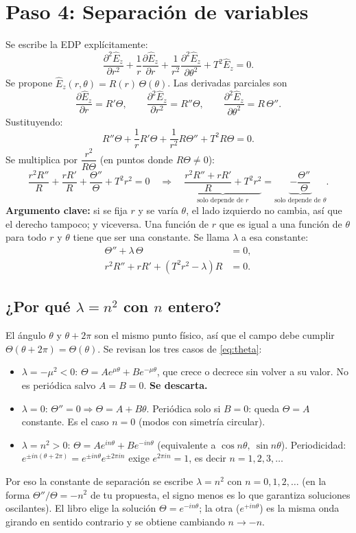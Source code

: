 \documentclass[11pt,a4paper]{article}
\begin{document}
\section{Paso 4: Separación de variables}

Se escribe la EDP explícitamente:
\[
\frac{\partial^2\hat E_z}{\partial r^2}+\frac1r\frac{\partial\hat E_z}{\partial r}+\frac1{r^2}\frac{\partial^2\hat E_z}{\partial\theta^2}+T^2\hat E_z=0 .
\]
Se propone $\hat E_z(r,\theta)=R(r)\,\Theta(\theta)$. Las derivadas parciales son
\[
\frac{\partial\hat E_z}{\partial r}=R'\Theta,\qquad
\frac{\partial^2\hat E_z}{\partial r^2}=R''\Theta,\qquad
\frac{\partial^2\hat E_z}{\partial\theta^2}=R\,\Theta'' .
\]
Sustituyendo:
\[
R''\Theta+\frac1rR'\Theta+\frac1{r^2}R\Theta''+T^2R\Theta=0 .
\]
Se multiplica por $\dfrac{r^2}{R\Theta}$ (en puntos donde $R\Theta\neq0$):
\[
\frac{r^2R''}{R}+\frac{rR'}{R}+\frac{\Theta''}{\Theta}+T^2r^2=0
\quad\Longrightarrow\quad
\underbrace{\frac{r^2R''+rR'}{R}+T^2r^2}_{\text{solo depende de }r}=\underbrace{-\frac{\Theta''}{\Theta}}_{\text{solo depende de }\theta}.
\]
\textbf{Argumento clave:} si se fija $r$ y se varía $\theta$, el lado izquierdo no cambia, así que el derecho tampoco; y viceversa. Una función de $r$ que es igual a una función de $\theta$ para todo $r$ y $\theta$ tiene que ser una constante. Se llama $\lambda$ a esa constante:
\begin{align}
\Theta''+\lambda\,\Theta&=0, \label{eq:theta}\\
r^2R''+rR'+(T^2r^2-\lambda)R&=0. \label{eq:radial}
\end{align}

\subsection{¿Por qué $\lambda=n^2$ con $n$ entero?}
El ángulo $\theta$ y $\theta+2\pi$ son el mismo punto físico, así que el campo debe cumplir $\Theta(\theta+2\pi)=\Theta(\theta)$. Se revisan los tres casos de \eqref{eq:theta}:
\begin{itemize}
\item $\lambda=-\mu^2<0$: $\Theta=Ae^{\mu\theta}+Be^{-\mu\theta}$, que crece o decrece sin volver a su valor. No es periódica salvo $A=B=0$. \textbf{Se descarta.}
\item $\lambda=0$: $\Theta''=0\Rightarrow\Theta=A+B\theta$. Periódica solo si $B=0$: queda $\Theta=A$ constante. Es el caso $n=0$ (modos con simetría circular).
\item $\lambda=n^2>0$: $\Theta=Ae^{in\theta}+Be^{-in\theta}$ (equivalente a $\cos n\theta,\ \sin n\theta$). Periodicidad: $e^{\pm in(\theta+2\pi)}=e^{\pm in\theta}e^{\pm 2\pi i n}$ exige $e^{2\pi in}=1$, es decir $n=1,2,3,\dots$
\end{itemize}
Por eso la constante de separación se escribe $\lambda=n^2$ con $n=0,1,2,\dots$ (en la forma $\Theta''/\Theta=-n^2$ de tu propuesta, el signo menos es lo que garantiza soluciones oscilantes). El libro elige la solución $\Theta=e^{-in\theta}$; la otra ($e^{+in\theta}$) es la misma onda girando en sentido contrario y se obtiene cambiando $n\to-n$.
\end{document}
